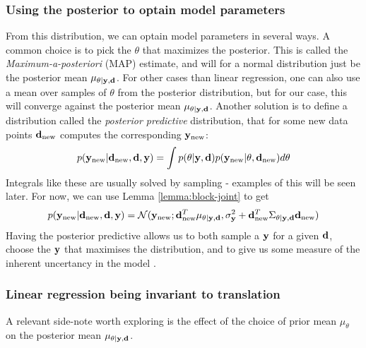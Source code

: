 \subsubsection{Using the posterior to optain model parameters}
From this distribution, we can optain model parameters in several ways. 
A common choice is to pick the $\theta$ that maximizes the posterior. This is called the \textit{Maximum-a-posteriori} (MAP) estimate, and will for a normal distribution just be the posterior mean $\mu_{\theta | \mathbf{y}, \mathbf{d}}$.
For other cases than linear regression, one can also use a mean over samples of $\theta$ from the posterior distribution, but for our case, this will converge against the posterior mean $\mu_{\theta | \mathbf{y}, \mathbf{d}}$.
Another solution is to define a distribution called the \textit{posterior predictive} distribution, that for some new data points $\mathbf{d}_{\textrm{new}}$ computes the corresponding $\mathbf{y}_{\textrm{new}}$:
\begin{equation}p(\mathbf{y}_{\textrm{new}} | \mathbf{d}_{\textrm{new}}, \mathbf{d}, \mathbf{y}) = \int p(\theta | \mathbf{y}, \mathbf{d}) p(\mathbf{y}_{\textrm{new}} | \theta, \mathbf{d}_\textrm{new})d\theta\end{equation}
Integrals like these are usually solved by sampling - examples of this will be seen later. For now, we can use Lemma \ref{lemma:block-joint} to get
\begin{equation}p(\mathbf{y}_{\textrm{new}} | \mathbf{d}_{\textrm{new}}, \mathbf{d}, \mathbf{y}) = \mathcal{N}(\mathbf{y}_\textrm{new}; \mathbf{d}_\textrm{new}^T\mu_{\theta|\mathbf{y}, \mathbf{d}}, \sigma^2_{\mathbf{y}} + \mathbf{d}_\textrm{new}^T\Sigma_{\theta | \mathbf{y}, \mathbf{d}}\mathbf{d}_\textrm{new})\end{equation}
Having the posterior predictive allows us to both sample a $\mathbf{y}$ for a given $\mathbf{d}$, choose the $\mathbf{y}$ that maximises the distribution, and to give us some measure of the inherent uncertancy in the model \cite{krause22}.
\subsubsection{Linear regression being invariant to translation}
A relevant side-note worth exploring is the effect of the choice of prior mean $\mu_\theta$ on the posterior mean $\mu_{\theta | \mathbf{y}, \mathbf{d}}$.


